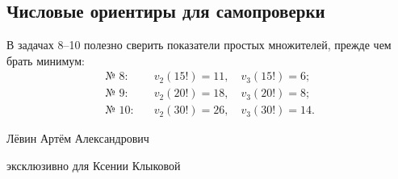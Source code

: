 \documentclass[a4paper,11pt]{article}
\newcommand{\nuval}[2]{v_{#1}(#2)}
\begin{document}
\subsection*{Числовые ориентиры для самопроверки}
В задачах 8--10 полезно сверить показатели простых множителей, прежде чем брать минимум:
\begin{align*}
\text{№ 8:}\quad&\nuval{2}{15!}=11,\quad \nuval{3}{15!}=6;\\
\text{№ 9:}\quad&\nuval{2}{20!}=18,\quad \nuval{3}{20!}=8;\\
\text{№ 10:}\quad&\nuval{2}{30!}=26,\quad \nuval{3}{30!}=14.
\end{align*}

\vfill
\begin{center}\small\color{softgray}
Лёвин Артём Александрович\par
эксклюзивно для Ксении Клыковой
\end{center}
\end{document}
